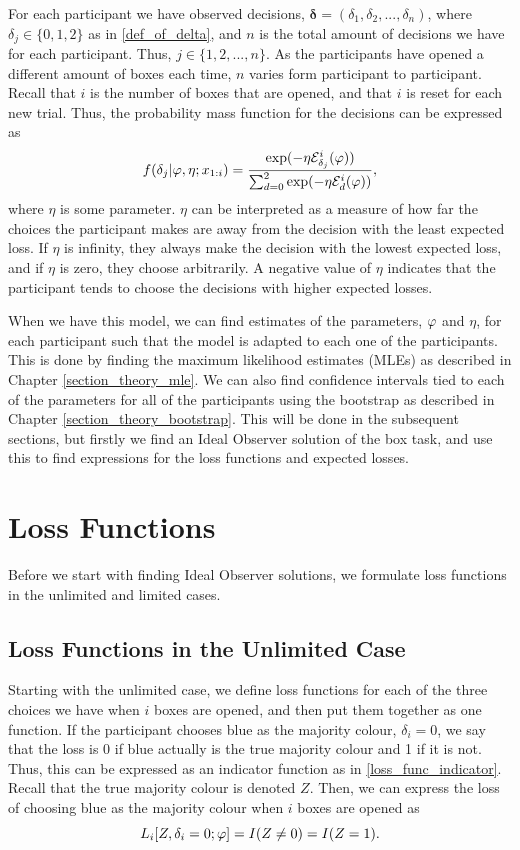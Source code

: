 For each participant we have observed decisions, $\boldsymbol{\delta}=(\delta_1,\delta_2,...,\delta_n)$, where $\delta_j \in \{0,1,2 \}$ as in \eqref{def_of_delta}, and $n$ is the total amount of decisions we have for each participant. Thus, $j\in \{1,2,...,n \}$. As the participants have opened a different amount of boxes each time, $n$ varies form participant to participant. Recall that $i$ is the number of boxes that are opened, and that $i$ is reset for each new trial. Thus, the probability mass function for the decisions can be expressed as
\begin{equation}
\label{softmax_theta}
    f(\delta_{j}|\varphi,\eta;x_{1:i}) = \frac{\text{exp}(- \eta \mathcal{E}^i_{\delta_{j}}(\varphi))}{\sum_{d=0}^{2} \text{exp}(-\eta \mathcal{E}^i_{d}(\varphi))},
\end{equation}
where $\eta$ is some parameter. $\eta$ can be interpreted as a measure of how far the choices the participant makes are away from the decision with the least expected loss. If $\eta$ is infinity, they always make the decision with the lowest expected loss, and if $\eta$ is zero, they choose arbitrarily. A negative value of $\eta$ indicates that the participant tends to choose the decisions with higher expected losses.


When we have this model, we can find estimates of the parameters, $\varphi$ and $\eta$, for each participant such that the model is adapted to each one of the participants. This is done by finding the maximum likelihood estimates (MLEs) as described in Chapter \ref{section_theory_mle}. 
We can also find confidence intervals tied to each of the parameters for all of the participants using the bootstrap as described in Chapter \ref{section_theory_bootstrap}. This will be done in the subsequent sections, but firstly we find an Ideal Observer solution of the box task, and use this to find expressions for the loss functions and expected losses. 


\section{Loss Functions}
Before we start with finding Ideal Observer solutions, we formulate loss functions in the unlimited and limited cases. 

\subsection{Loss Functions in the Unlimited Case}
Starting with the unlimited case, we define loss functions for each of the three choices we have when $i$ boxes are opened, and then put them together as one function. If the participant chooses blue as the majority colour, $\delta_i=0$, we say that the loss is 0 if blue actually is the true majority colour and 1 if it is not. Thus, this can be expressed as an indicator function as in \eqref{loss_func_indicator}. Recall that the true majority colour is denoted $Z$. Then, we can express the loss of choosing blue as the majority colour when $i$ boxes are opened as
\begin{equation}
\label{loss_func_blue}
    L_i[Z,\delta_i=0;\varphi] = I(Z\neq0) = I(Z=1).
\end{equation}

